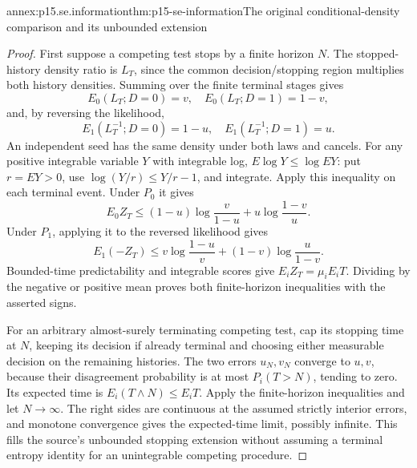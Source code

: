 \begin{annexitem}{annex:p15.se.information}{thm:p15-se-information}{The original conditional-density comparison and its unbounded extension}
\begin{proof}
First suppose a competing test stops by a finite horizon \(N\).
The stopped-history density ratio is \(L_T\), since the common
decision/stopping region multiplies both history densities. Summing over
the finite terminal stages gives
\[
 E_0(L_T;D=0)=v,\quad E_0(L_T;D=1)=1-v,
\]
and, by reversing the likelihood,
\[
 E_1(L_T^{-1};D=0)=1-u,\quad
 E_1(L_T^{-1};D=1)=u.
\]
An independent seed has the same density under both laws and cancels.
For any positive integrable variable \(Y\) with integrable log,
\(E\log Y\leq\log EY\): put \(r=EY>0\), use
\(\log(Y/r)\leq Y/r-1\), and integrate. Apply this inequality
on each terminal event. Under \(P_0\) it gives
\[
 E_0Z_T\leq(1-u)\log\frac v{1-u}
                    +u\log\frac{1-v}u.
\]
Under \(P_1\), applying it to the reversed likelihood gives
\[
 E_1(-Z_T)\leq v\log\frac{1-u}v
                    +(1-v)\log\frac u{1-v}.
\]
Bounded-time predictability and integrable scores give
\(E_iZ_T=\mu_iE_iT\). Dividing by the negative or positive
mean proves both finite-horizon inequalities with the asserted signs.

For an arbitrary almost-surely terminating competing test, cap its
stopping time at \(N\), keeping its decision if already terminal and
choosing either measurable decision on the remaining histories. The two
errors \(u_N,v_N\) converge to \(u,v\), because their disagreement
probability is at most \(P_i(T>N)\), tending to zero. Its expected
time is \(E_i(T\wedge N)\leq E_iT\). Apply the finite-horizon
inequalities and let \(N\to\infty\). The right sides are continuous
at the assumed strictly interior errors, and monotone convergence gives
the expected-time limit, possibly infinite. This fills the source's
unbounded stopping extension without assuming a terminal entropy identity
for an unintegrable competing procedure.
\end{proof}
\end{annexitem}

